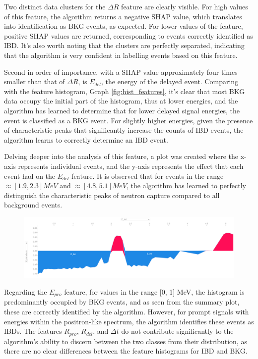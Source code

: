 Two distinct data clusters for the $\Delta R$ feature are clearly visible. For high values of this feature, the algorithm returns a negative SHAP value, which translates into identification as BKG events, as expected. For lower values of the feature, positive SHAP values are returned, corresponding to events correctly identified as IBD. It's also worth noting that the clusters are perfectly separated, indicating that the algorithm is very confident in labelling events based on this feature.

Second in order of importance, with a SHAP value approximately four times smaller than that of $\Delta R$, is $E_{del}$, the energy of the delayed event. Comparing with the feature histogram, Graph \ref{fig:hist_features}, it's clear that most BKG data occupy the initial part of the histogram, thus at lower energies, and the algorithm has learned to determine that for lower delayed signal energies, the event is classified as a BKG event. For slightly higher energies, given the presence of characteristic peaks that significantly increase the counts of IBD events, the algorithm learns to correctly determine an IBD event. 

Delving deeper into the analysis of this feature, a plot was created where the x-axis represents individual events, and the y-axis represents the effect that each event had on the $E_{del}$ feature. It is observed that for events in the range $\approx[1.9, 2.3] MeV$ and $\approx[4.8, 5.1] MeV$, the algorithm has learned to perfectly distinguish the characteristic peaks of neutron capture compared to all background events.

\begin{figure}[h!]
	\centering
	\includegraphics[width=\linewidth]{Images/Shap/E_del_force_plot.png}
	\label{fig:E_del_force_plot}
\end{figure}

Regarding the $E_{pro}$ feature, for values in the range [0, 1] MeV, the histogram is predominantly occupied by BKG events, and as seen from the summary plot, these are correctly identified by the algorithm. However, for prompt signals with energies within the positron-like spectrum, the algorithm identifies these events as IBDs. The features $R_{pro}$, $R_{del}$, and $\Delta t$ do not contribute significantly to the algorithm's ability to discern between the two classes from their distribution, as there are no clear differences between the feature histograms for IBD and BKG.



